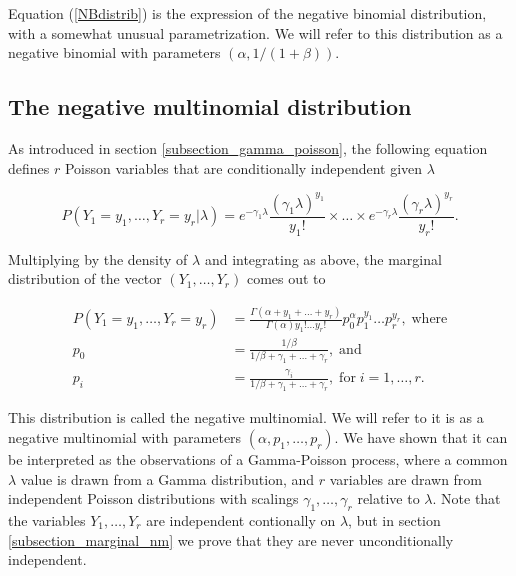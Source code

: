 \documentclass[12pt]{article}
\begin{document}
\begin{appendices}
    Equation (\ref{NBdistrib}) is the expression of the negative
    binomial distribution, with a somewhat unusual parametrization.
    We will refer to this distribution as a negative binomial
    with parameters $(\alpha, 1/(1+\beta))$.

  \subsection{The negative multinomial distribution}

    As introduced in section \ref{subsection_gamma_poisson},
    the following equation defines $r$ Poisson
    variables that are conditionally independent given $\lambda$

    \begin{equation}
\label{bayesian_nm}
      P(Y_1=y_1, \ldots, Y_r=y_r|\lambda) = 
      e^{-\gamma_1\lambda}\frac{(\gamma_1\lambda)^{y_1}}{y_1!}
      \times \ldots \times
      e^{-\gamma_r\lambda}\frac{(\gamma_r\lambda)^{y_r}}{y_r!}.
    \end{equation}

    Multiplying by the density of $\lambda$ and integrating as
    above, the marginal distribution of the vector
    $(Y_1, \ldots, Y_r)$ comes out to

    \begin{align}
\label{NMdistrib}
      P(Y_1=y_1, \ldots, Y_r=y_r) &=
      \frac{\Gamma(\alpha+y_1+\ldots+y_r)}
      {\Gamma(\alpha)y_1!\ldots y_r!}p_0^{\alpha}p_1^{y_1}
      \ldots p_r^{y_r}, \; \text{where}                \\
      p_0 &= \frac{1/\beta}{1/\beta+\gamma_1+\ldots+\gamma_r},
      \; \text{and} \nonumber \\
      p_i &= \frac{\gamma_i}{1/\beta+\gamma_1+\ldots+\gamma_r},
      \; \text{for} \; i = 1, \ldots, r. \nonumber
    \end{align}

    This distribution is called the negative multinomial. We will
    refer to it is as a negative multinomial with parameters
    $(\alpha, p_1, \ldots, p_r)$.
    We have shown that it can be interpreted as the observations of
    a Gamma-Poisson process, where a common $\lambda$ value is
    drawn from a Gamma distribution, and $r$ variables are drawn
    from independent Poisson distributions with scalings
    $\gamma_1, \ldots, \gamma_r$ relative to $\lambda$. Note that
    the variables $Y_1, \ldots, Y_r$ are independent contionally on
    $\lambda$, but in section \ref{subsection_marginal_nm} we prove
    that they are never unconditionally independent.


\end{appendices}
\end{document}
